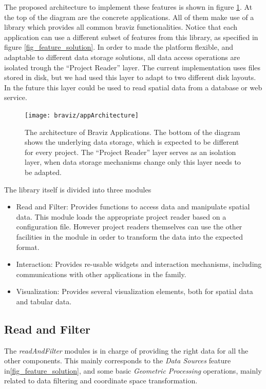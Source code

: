 The proposed architecture to implement these features is shown in figure \ref{fig_archi}. At the top of the diagram are the concrete applications. All of them make use of a library which provides all common braviz functionalities. Notice that each application can use a different subset of features from this library, as specified in figure \ref{fig_feature_solution}. In order to made the platform flexible, and adaptable to different data storage solutions, all data access operations are isolated trough the "`Project Reader"' layer. The current implementation uses files stored in disk, but we had used this layer to adapt to two different disk layouts. In the future this layer could be used to read spatial data from a database or web service. 

\begin{figure}
\texttt{[image: braviz/appArchitecture]}%
\caption{\label{fig_archi} The architecture of Braviz Applications. The bottom of the diagram shows the underlying data storage, which is expected to be different for every project. The "`Project Reader"' layer serves as an isolation layer, when data storage mechanisms change only this layer needs to be adapted.}
\end{figure}

The library itself is divided into three modules

\begin{itemize}
	\item Read and Filter: Provides functions to access data and manipulate spatial data. This module loads the appropriate project reader based on a configuration file. However project readers themselves can use the other facilities in the module in order to transform the data into the expected format.
	\item Interaction: Provides re-usable widgets and interaction mechanisms, including communications with other applications in the family.
	\item Visualization: Provides several visualization elements, both for spatial data and tabular data.
\end{itemize}



\subsection{Read and Filter}

The \emph{readAndFilter} modules is in charge of providing the right data for all the other components. This mainly corresponds to the \emph{Data Sources} feature in\ref{fig_feature_solution}, and some basic \emph{Geometric Processing} operations, mainly related to data filtering and coordinate space transformation. 


